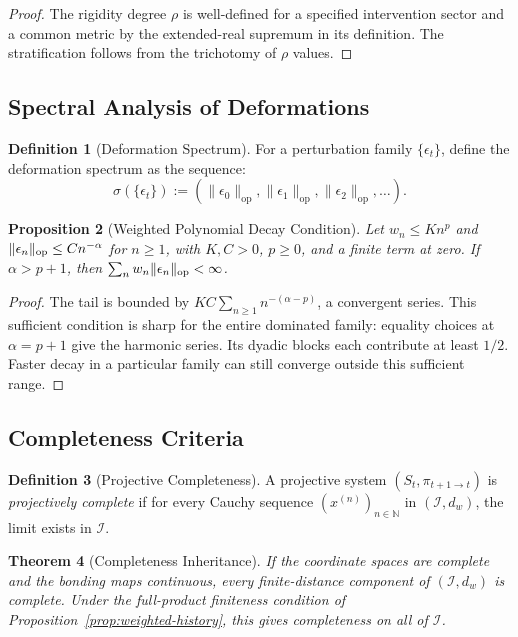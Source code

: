 \documentclass[11pt,a4paper]{article}
\theoremstyle{plain}
\newtheorem{theorem}{Theorem}[section]
\newtheorem{proposition}[theorem]{Proposition}
\theoremstyle{definition}
\newtheorem{definition}[theorem]{Definition}
\theoremstyle{remark}
\begin{document}
\begin{proof}
The rigidity degree $\rho$ is well-defined for a specified intervention sector and a common metric by the extended-real supremum in its definition. The stratification follows from the trichotomy of $\rho$ values.
\end{proof}

\subsection{Spectral Analysis of Deformations}

\begin{definition}[Deformation Spectrum]
For a perturbation family $\{\epsilon_t\}$, define the deformation spectrum as the sequence:
\begin{equation}
    \sigma(\{\epsilon_t\}) := \left( \|\epsilon_0\|_{\text{op}}, \|\epsilon_1\|_{\text{op}}, \|\epsilon_2\|_{\text{op}}, \ldots \right).
\end{equation}
\end{definition}

\begin{proposition}[Weighted Polynomial Decay Condition]
Let $w_n\le K n^p$ and $\|\epsilon_n\|_{\rm op}\le C n^{-\alpha}$ for $n\ge1$, with $K,C>0$, $p\ge0$, and a finite term at zero. If $\alpha>p+1$, then $\sum_n w_n\|\epsilon_n\|_{\rm op}<\infty$.
\end{proposition}
\begin{proof}
The tail is bounded by $KC\sum_{n\ge1}n^{-(\alpha-p)}$, a convergent series. This sufficient condition is sharp for the entire dominated family: equality choices at $\alpha=p+1$ give the harmonic series. Its dyadic blocks each contribute at least $1/2$. Faster decay in a particular family can still converge outside this sufficient range.
\end{proof}

\subsection{Completeness Criteria}

\begin{definition}[Projective Completeness]
A projective system $(S_t, \pi_{t+1 \to t})$ is \textit{projectively complete} if for every Cauchy sequence $(x^{(n)})_{n \in \mathbb{N}}$ in $(\mathcal{I}, d_w)$, the limit exists in $\mathcal{I}$.
\end{definition}

\begin{theorem}[Completeness Inheritance]\label{thm:completeness}
If the coordinate spaces are complete and the bonding maps continuous, every finite-distance component of $(\mathcal I,d_w)$ is complete. Under the full-product finiteness condition of Proposition~\ref{prop:weighted-history}, this gives completeness on all of $\mathcal I$.
\end{theorem}
\end{document}
